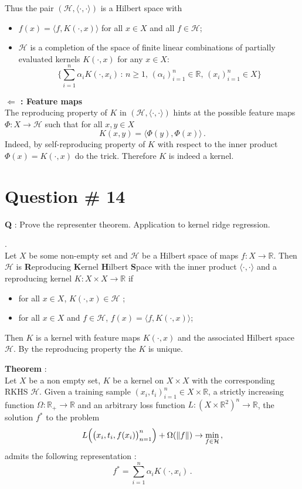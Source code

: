\documentclass[a4paper]{article}
\newcommand{\Real}{\mathbb{R}}
\newcommand{\Hcal}{\mathcal{H}}
\begin{document}
Thus the pair $(\Hcal,\langle\cdot,\cdot\rangle)$ is a Hilbert space with \begin{itemize}
	\item $f(x) = \langle f, K(\cdot, x)\rangle$ for all $x\in X$ and all $f\in\Hcal$;
	\item $\Hcal$ is a completion of the space of finite linear combinations of
	partially evaluated kernels $K(\cdot,x)$ for any $x\in X$:
	\[ \bigl\{ \sum_{i=1}^n \alpha_i K(\cdot,x_i)\,:\,n\geq1,\,(\alpha_i)_{i=1}^n\in \Real,\,(x_i)_{i=1}^n\in X \bigr\} \]
\end{itemize}

\noindent \textbf{ $\Leftarrow$ : Feature maps}\hfill\\
The reproducing property of $K$ in $(\Hcal,\langle\cdot,\cdot\rangle)$ hints at
the possible feature maps $\Phi:X\to \Hcal$ such that for all $x,y\in X$
\[ K(x,y) = \langle \Phi(y), \Phi(x)\rangle\,. \]
Indeed, by self-reproducing property of $K$ with respect to the inner product
$\Phi(x) = K(\cdot,x)$ do the trick. Therefore $K$ is indeed a kernel.

\clearpage

\section[Representer]{Question \# 14} %
\label{sec:question_14}
\textbf{\large \textbf{Q}} : Prove the representer theorem. Application to kernel
ridge regression.

 .\hfill\\
Let $X$ be some non-empty set and $\Hcal$ be a Hilbert space of maps $f:X\to\Real$.
Then $\Hcal$ is \textbf{R}eproducing \textbf{K}ernel \textbf{H}ilbert \textbf{S}pace
with the inner product $\langle\cdot, \cdot\rangle$ and a reproducing kernel $K: X\times X\to \Real$
if \begin{itemize}
	\item for all $x\in X$, $K(\cdot,x) \in \Hcal$ ;
	\item for all $x\in X$ and $f\in \Hcal$, $f(x) = \langle f, K(\cdot, x) \rangle$;
\end{itemize}
Then $K$ is a kernel with feature maps $K(\cdot,x)$ and the associated Hilbert space
$\Hcal$. By the reproducing property the $K$ is unique.

\noindent\textbf{Theorem} : \hfill\\
Let $X$ be a non empty set, $K$ be a kernel on $X\times X$ with the corresponding
RKHS $\Hcal$. Given a training sample $(x_i, t_i)_{i=1}^n \in X \times \Real$, a
strictly increasing function $\Omega:\Real_+\to\Real$ and an arbitrary loss function
$L:( X\times \Real^2)^n \to \Real$, the solution $f^*$ to the problem
\[
L\Bigl( \bigl(x_i,t_i,f(x_i)\bigr)_{n=1}^n \Bigr) + \Omega(\|f\|) \to \min_{f\in \Hcal}\,,
\]
admits the following representation :
\[ f^* = \sum_{i=1}^n \alpha_i K( \cdot, x_i ) \,. \]
\end{document}
